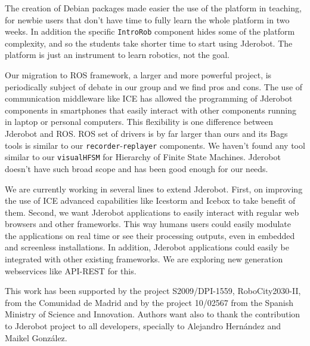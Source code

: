 \documentclass[twocolumn]{svjour3}          %
\begin{document}
The creation of Debian packages made easier the use of the platform in teaching, for newbie users that don't have time to fully learn the whole platform in two weeks. In addition the specific \texttt{IntroRob} component hides some of the platform complexity, and so the students take shorter time to start using Jderobot. The platform is just an instrument to learn robotics, not the goal.

Our migration to ROS framework, a larger and more powerful project, is periodically subject of debate in our group and we find pros and cons. The use of communication middleware like ICE has allowed the programming of Jderobot components in smartphones that easily interact with other components running in laptop or personal computers. This flexibility is one difference between Jderobot and ROS. ROS set of drivers is by far larger than ours and its Bags tools is similar to our \texttt{recorder}-\texttt{replayer} components. We haven't found any tool similar to our \texttt{visualHFSM} for Hierarchy of Finite State Machines. Jderobot doesn't have such broad scope and has been good enough for our needs. 

We are currently working in several lines to extend Jderobot. First, on improving the use of ICE advanced capabilities like Icestorm and Icebox to take benefit of them. Second, we want Jderobot applications to easily interact with regular web browsers and other frameworks. This way humans users could easily modulate the applications on real time or see their processing outputs, even in embedded and screenless installations. In addition, Jderobot applications could easily be integrated with other existing frameworks. We are exploring new generation webservices like API-REST for this. 



\begin{acknowledgements}
This work has been supported by the project S2009/DPI-1559, RoboCity2030-II, from the Comunidad de Madrid and by the project 10/02567 from the Spanish Ministry of Science and Innovation. Authors want also to thank the contribution to Jderobot project to all developers, specially to Alejandro Hernández and Maikel González.
\end{acknowledgements}

  
\end{document}
